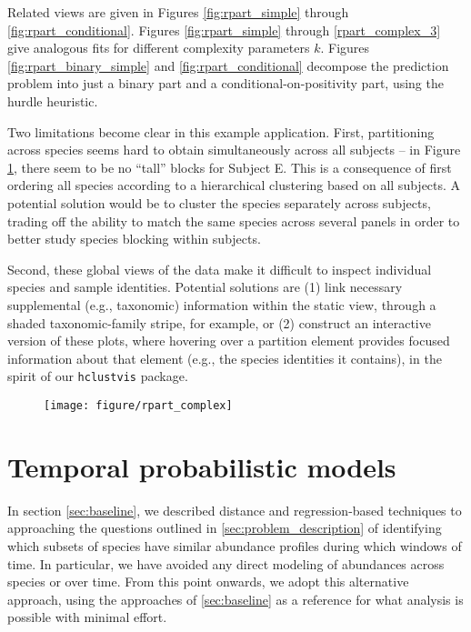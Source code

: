\documentclass{article}
\begin{document}
Related views are given in Figures \ref{fig:rpart_simple} through
\ref{fig:rpart_conditional}. Figures \ref {fig:rpart_simple} through
\ref{rpart_complex_3} give analogous fits for different complexity parameters
$k$. Figures \ref{fig:rpart_binary_simple} and \ref{fig:rpart_conditional}
decompose the prediction problem into just a binary part and a
conditional-on-positivity part, using the hurdle heuristic.

Two limitations become clear in this example application. First, partitioning
across species seems hard to obtain simultaneously across all subjects -- in
Figure \ref{fig:rpart_complex}, there seem to be no ``tall'' blocks for Subject
E. This is a consequence of first ordering all species according to a
hierarchical clustering based on all subjects. A potential solution would be to
cluster the species separately across subjects, trading off the ability to match
the same species across several panels in order to better study species blocking
within subjects.

Second, these global views of the data make it difficult to inspect individual
species and sample identities. Potential solutions are (1) link necessary
supplemental (e.g., taxonomic) information within the static view, through a
shaded taxonomic-family stripe, for example, or (2) construct an interactive
version of these plots, where hovering over a partition element provides focused
information about that element (e.g., the species identities it contains), in
the spirit of our \texttt{hclustvis} package.

\begin{figure}[ht]
  \centering
  \texttt{[image: figure/rpart\_complex]}
  \caption{\label{fig:rpart_complex} }
\end{figure}

\section{Temporal probabilistic models}
\label{sec:temporal_probabilistic_models}

In section \ref{sec:baseline}, we described distance and regression-based
techniques to approaching the questions outlined in
\ref{sec:problem_description} of identifying which subsets of species have
similar abundance profiles during which windows of time. In particular, we have
avoided any direct modeling of abundances across species or over time. From this
point onwards, we adopt this alternative approach, using the approaches of
\ref{sec:baseline} as a reference for what analysis is possible with minimal
effort.
\end{document}
